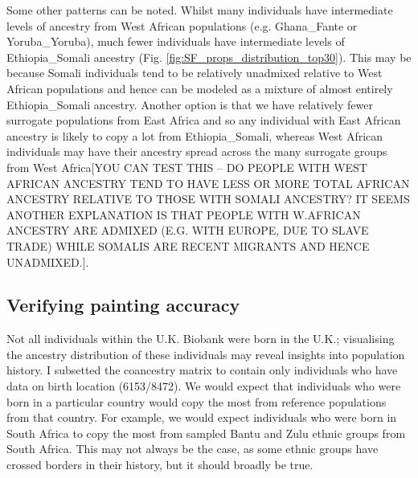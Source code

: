 Some other patterns can be noted. Whilst many individuals have intermediate levels of ancestry from West African populations (e.g. Ghana\_Fante or Yoruba\_Yoruba), much fewer individuals have intermediate levels of Ethiopia\_Somali ancestry (Fig. \ref{fig:SF_props_distribution_top30}). This may be because Somali individuals tend to be relatively unadmixed relative to West African populations and hence can be modeled as a mixture of almost entirely Ethiopia\_Somali ancestry. Another option is that we have relatively fewer surrogate populations from East Africa and so any individual with East African ancestry is likely to copy a lot from Ethiopia\_Somali, whereas West African individuals may have their ancestry spread across the many surrogate groups from West Africa{\color{red}[YOU CAN TEST THIS -- DO PEOPLE WITH WEST AFRICAN ANCESTRY TEND TO HAVE LESS OR MORE TOTAL AFRICAN ANCESTRY RELATIVE TO THOSE WITH SOMALI ANCESTRY? IT SEEMS ANOTHER EXPLANATION IS THAT PEOPLE WITH W.AFRICAN ANCESTRY ARE ADMIXED (E.G. WITH EUROPE, DUE TO SLAVE TRADE) WHILE SOMALIS ARE RECENT MIGRANTS AND HENCE UNADMIXED.]}. 
%

\subsection{Verifying painting accuracy}

Not all individuals within the U.K. Biobank were born in the U.K.; visualising the ancestry distribution of these individuals may reveal insights into population history. I subsetted the coancestry matrix to contain only individuals who have data on birth location (6153/8472). We would expect that individuals who were born in a particular country would copy the most from reference populations from that country. For example, we would expect individuals who were born in South Africa to copy the most from sampled Bantu and Zulu ethnic groups from South Africa. This may not always be the case, as some ethnic groups have crossed borders in their history, but it should broadly be true.

